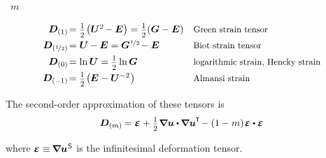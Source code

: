 \vspace{.1em} \noindent {}~$m$

\nopagebreak\begin{equation*}
\begin{array}{r@{\hspace{0.1em}}ll}
\bm{D}_{(1)} & = \smalldisplaystyleonehalf \hspace{-0.25ex} \left( \bm{U}^{2} \hspace{-0.25ex} - \UnitDyad \right) = \smalldisplaystyleonehalf (\bm{G} - \UnitDyad) & \text{\scalebox{0.9}{Green strain tensor}}
\\[.4em]
\bm{D}_{(\nicefrac{1}{2})} & = \bm{U} \hspace{-0.15ex} - \UnitDyad = \bm{G}^{\hspace{.1ex}\nicefrac{1}{2}} \hspace{-0.25ex} - \UnitDyad & \text{\scalebox{0.9}{Biot strain tensor}}
\\[.4em]
\bm{D}_{(0)} & = \ln \bm{U} = \smalldisplaystyleonehalf \ln \bm{G} & \text{\scalebox{0.9}{logarithmic strain, Hencky strain}}
\\[.4em]
\bm{D}_{(-\hspace{-0.1ex}1)} & = \smalldisplaystyleonehalf \hspace{-0.25ex} \left( \hspace{-0.1ex} \UnitDyad - \bm{U}^{-2} \hspace{.1ex} \right) & \text{\scalebox{0.9}{Almansi strain}}
\end{array}
\end{equation*}

The second\hbox{-}order approximation of these tensors is
\[ \bm{D}_{(m)} \hspace{-0.2ex} =
\infinitesimaldeformation
+ \smalldisplaystyleonehalf \hspace{.1ex} \boldnabla\bm{u} \dotp \hspace{-0.1ex} \boldnabla\bm{u}^{\hspace{-0.1ex}\T} \hspace{-0.3ex}
- (1 - m) \hspace{.2ex} \infinitesimaldeformation \dotp \infinitesimaldeformation \]

\vspace{-0.25em}\noindent
where ${\infinitesimaldeformation \equiv \hspace{-0.2ex} \boldnabla {\bm{u}}^{\hspace{.1ex}\mathsf{S}}}$ is the infinitesimal deformation tensor.

